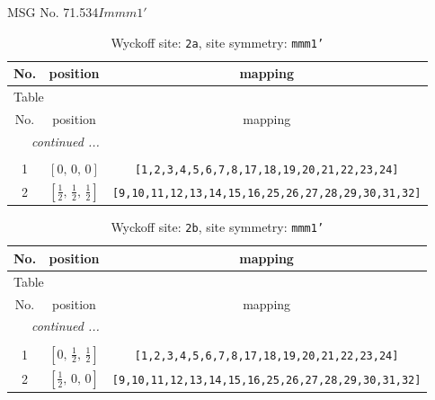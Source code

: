 \documentclass[fleqn,8pt]{jsarticle}
\begin{document}
\setcounter{MaxMatrixCols}{32}

\renewcommand{\tablename}{Table~}
\renewcommand{\figurename}{Figure~}
\begin{center}
\LARGE
MSG No. 71.534\quad$Immm1'$
\end{center}
\renewcommand{\arraystretch}{1.2}
\begin{longtable}{ccc}
\caption{Wyckoff site: {\tt 2a}, site symmetry: {\tt mmm1'}}
 \\
 \hline \hline
No. & position & mapping \\ \hline \endfirsthead

\multicolumn{2}{l}{\tablename\ \thetable{}} \\
 \hline \hline
No. & position & mapping \\ \hline \endhead

 \hline \hline
\multicolumn{2}{r}{\footnotesize\it continued ...} \\ \endfoot

 \hline \hline
\multicolumn{2}{r}{} \\ \endlastfoot

1 & $\left[ 0,\, 0,\, 0 \right]$ & {\tt [1,2,3,4,5,6,7,8,17,18,19,20,21,22,23,24]} \\ \hline
2 & $\left[ \frac{1}{2},\, \frac{1}{2},\, \frac{1}{2} \right]$ & {\tt [9,10,11,12,13,14,15,16,25,26,27,28,29,30,31,32]} \\
\end{longtable}
\renewcommand{\arraystretch}{1.2}
\begin{longtable}{ccc}
\caption{Wyckoff site: {\tt 2b}, site symmetry: {\tt mmm1'}}
 \\
 \hline \hline
No. & position & mapping \\ \hline \endfirsthead

\multicolumn{2}{l}{\tablename\ \thetable{}} \\
 \hline \hline
No. & position & mapping \\ \hline \endhead

 \hline \hline
\multicolumn{2}{r}{\footnotesize\it continued ...} \\ \endfoot

 \hline \hline
\multicolumn{2}{r}{} \\ \endlastfoot

1 & $\left[ 0,\, \frac{1}{2},\, \frac{1}{2} \right]$ & {\tt [1,2,3,4,5,6,7,8,17,18,19,20,21,22,23,24]} \\ \hline
2 & $\left[ \frac{1}{2},\, 0,\, 0 \right]$ & {\tt [9,10,11,12,13,14,15,16,25,26,27,28,29,30,31,32]} \\
\end{longtable}
\end{document}
